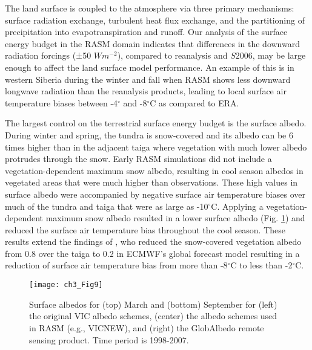 The land surface is coupled to the atmosphere via three primary mechanisms: surface radiation exchange, turbulent heat flux exchange, and the partitioning of precipitation into evapotranspiration and runoff.
Our analysis of the surface energy budget in the RASM domain indicates that differences in the downward radiation forcings (±50 $W m^{-2}$), compared to reanalysis and $S2006$, may be large enough to affect the land surface model performance.
An example of this is in western Siberia during the winter and fall when RASM shows less downward longwave radiation than the reanalysis products, leading to local surface air temperature biases between -4$^{\circ}$ and -8$^{\circ}$C as compared to ERA.

The largest control on the terrestrial surface energy budget is the surface albedo.
During winter and spring, the tundra is snow-covered and its albedo can be 6 times higher than in the adjacent taiga \citep{Chapin_2000b} where vegetation with much lower albedo protrudes through the snow.
Early RASM simulations did not include a vegetation-dependent maximum snow albedo, resulting in cool season albedos in vegetated areas that were much higher than observations.
These high values in surface albedo were accompanied by negative surface air temperature biases over much of the tundra and taiga that were as large as -10$^{\circ}$C.
Applying a vegetation-dependent maximum snow albedo resulted in a lower surface albedo (Fig. \ref{fig:albedo_maps}) and reduced the surface air temperature bias throughout the cool season.
These results extend the findings of \citet{Viterbo_1999}, who reduced the snow-covered vegetation albedo from 0.8 over the taiga to 0.2 in ECMWF’s global forecast model resulting in a reduction of surface air temperature bias from more than -8$^{\circ}$C to less than -2$^{\circ}$C.

\begin{figure}
  \centering
  \texttt{[image: ch3\_Fig9]}
  \caption{Surface albedos for (top) March and (bottom) September for (left) the original VIC albedo schemes, (center) the albedo schemes used in RASM (e.g., VICNEW), and (right) the GlobAlbedo remote sensing product.
  Time period is 1998-2007.}
  \label{fig:albedo_maps}
\end{figure}

